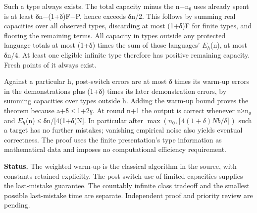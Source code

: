 \documentclass[11pt]{article}
\begin{document}
Such a type always exists. The total capacity minus the n−n₀ uses already spent is at least δn−(1+δ)F−P, hence exceeds δn/2. This follows by summing real capacities over all observed types, discarding at most (1+δ)F for finite types, and flooring the remaining terms. All capacity in types outside any protected language totals at most (1+δ) times the sum of those languages' \(E_{h}\)(n), at most δn/4. At least one eligible infinite type therefore has positive remaining capacity. Fresh points of it always exist.

Against a particular h, post-switch errors are at most δ times its warm-up errors in the demonstrations plus (1+δ) times its later demonstration errors, by summing capacities over types outside h. Adding the warm-up bound proves the theorem because a+δ ≤ 1+2γ. At round n+1 the output is correct whenever n≥n₀ and \(E_{h}\)(n) ≤ δn/{[}4(1+δ)N{]}. In particular after \(\max(n_0,\lceil4(1+\delta)Nb/\delta\rceil)\) such a target has no further mistakes; vanishing empirical noise also yields eventual correctness. The proof uses the finite presentation's type information as mathematical data and imposes no computational efficiency requirement.

\textbf{Status.} The weighted warm-up is the classical algorithm in the source, with constants retained explicitly. The post-switch use of limited capacities supplies the last-mistake guarantee. The countably infinite class tradeoff and the smallest possible last-mistake time are separate. Independent proof and priority review are pending.
\end{document}
